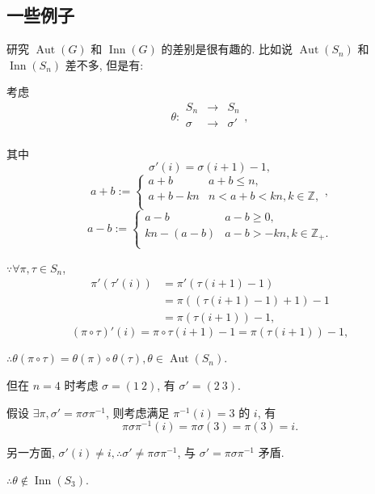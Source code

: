 \documentclass[color=black,device=normal,lang=cn,mode=geye]{elegantnote}
\begin{document}
\subsection{一些例子}
研究 $\operatorname{Aut}(G)$ 和 $\operatorname{Inn}(G)$ 的差别是很有趣的. 比如说 $\operatorname{Aut}(S_n)$ 和 $\operatorname{Inn}(S_n)$ 差不多, 但是有:
\begin{example}
    考虑
    \[\theta:\begin{array}{rcl}
        S_n & \to & S_n \\
        \sigma & \to & \sigma' \\
    \end{array},\]

    其中
    \[\sigma'(i)=\sigma(i+1)-1,\]
    \[a+b:=\begin{cases}
        a+b & a+b\leq n, \\
        a+b-kn & n<a+b<kn,k\in\mathbb{Z}, \\
    \end{cases},\]
    \[a-b:=\begin{cases}
        a-b & a-b\geq 0, \\
        kn-(a-b) & a-b>-kn,k\in\mathbb{Z}_+. \\
    \end{cases}\]
    
    $\because\forall\pi,\tau\in S_n$,
    \begin{align*}
        \pi'(\tau'(i)) & =\pi'(\tau(i+1)-1) \\
        & =\pi((\tau(i+1)-1)+1)-1 \\
        & =\pi(\tau(i+1))-1,
    \end{align*}
    \[(\pi\circ\tau)'(i)=\pi\circ\tau(i+1)-1=\pi(\tau(i+1))-1,\]

    $\therefore\theta(\pi\circ\tau)=\theta(\pi)\circ\theta(\tau),\theta\in\operatorname{Aut}(S_n)$.

    但在 $n=4$ 时考虑 $\sigma=(1\ 2)$, 有 $\sigma'=(2\ 3)$.

    假设 $\exists\pi,\sigma'=\pi\sigma\pi^{-1}$, 则考虑满足 $\pi^{-1}(i)=3$ 的 $i$, 有
    \[\pi\sigma\pi^{-1}(i)=\pi\sigma(3)=\pi(3)=i.\]

    另一方面, $\sigma'(i)\neq i,\therefore\sigma'\neq\pi\sigma\pi^{-1}$, 与 $\sigma'=\pi\sigma\pi^{-1}$ 矛盾.

    $\therefore\theta\notin\operatorname{Inn}(S_3)$.
\end{example}
\end{document}
